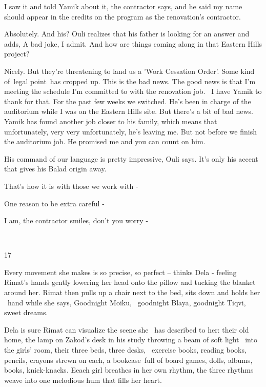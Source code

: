 \documentclass[letterpaper]{article}
\begin{document}
{\textquotedbl}I saw it and told Yamik about it,{\textquotedbl} the contractor says, {\textquotedbl}and he said my name
should appear in the credits on the program as the renovation's contractor.{\textquotedbl} 

{\textquotedbl}Absolutely. And his?{\textquotedbl} Ouli realizes that his father is looking for an answer and adds,
{\textquotedbl}A bad joke, I admit. And how are things coming along in that Eastern Hills project?{\textquotedbl} 

{\textquotedbl}Nicely. But they're threatening to land us a 'Work Cessation Order'. Some kind of~legal point~has cropped
up. This is the bad news. The good news is that I'm meeting the schedule I'm committed to with the renovation job. \ I
have Yamik to thank for that. For the past few weeks we switched. He's been in charge of the auditorium while I was on
the Eastern Hills site. But there's a bit of bad news. Yamik has found another job closer to his family, which means
that unfortunately, very very unfortunately, he's leaving me. But not before we finish the auditorium job. He promised
me and you can count on him.{\textquotedbl}

{\textquotedbl}His command of our language is pretty impressive,{\textquotedbl} Ouli says. {\textquotedbl}It's only his
accent that gives his Balad origin away.{\textquotedbl}

{\textquotedbl}That's how it is with those we work with -{\textquotedbl}

{\textquotedbl}One reason to be extra careful -{\textquotedbl}

{\textquotedbl}I am,{\textquotedbl} the contractor smiles, {\textquotedbl}don't you worry -{\textquotedbl}

~

17

Every movement she makes is so precise, so perfect -- thinks Dela - feeling Rimat's hands gently lowering her head onto
the pillow and tucking the blanket around her. Rimat then pulls up a chair next to the bed, sits down and holds her
\ hand while she says, {\textquotedbl}Goodnight Moiku, ~goodnight Blaya, goodnight Tiqvi, sweet dreams.{\textquotedbl} 

Dela is sure Rimat can visualize the scene she \ has described to her: their old home, the lamp on Zakod's desk in his
study throwing a beam of soft light \ into the girls' room, their three beds, three desks, \ exercise books, reading
books, pencils, crayons strewn on each, a bookcase~full of board games, dolls, albums, books, knick-knacks. Eeach girl
breathes in her own rhythm, the three rhythms weave into one melodious hum that fills her heart. 
\end{document}
